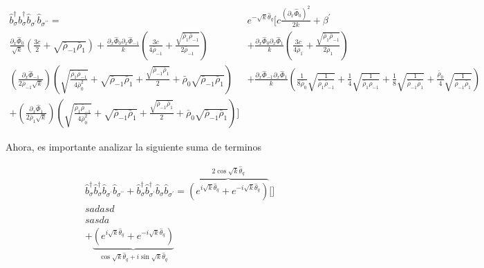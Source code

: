 \scriptsize
\begin{align}
\hat{b}_{\sigma}^{\dagger}\hat{b}_{\sigma}^{\dagger} \hat{b}_{\sigma^\prime}^{} \hat{b}_{\sigma^{\prime \prime}}^{} = & e^{-\sqrt{k}\hat{\theta}_{q}} \Big[  c \frac{(\partial_ x\hat{\Phi}_{0})^2}{2k} + \beta^{ \prime} \nonumber \\
\frac{\partial_x \hat{\Phi}_{0}}{\sqrt{k}} \left( \frac{3c}{2} + \sqrt{\bar{\rho}_{-1} \bar{\rho}_1}\right) + \frac{\partial_x \hat{\Phi}_{0}\partial_{x} \hat{\Phi}_{-1} }{k} \left( \frac{3c}{4 \bar{\rho}_{-1}} + \frac{\sqrt{\bar{\rho}_{1}\bar{\rho}_{-1}}}{2\bar{\rho}_{-1}} \right) &  + \frac{\partial_x \hat{\Phi}_{0}\partial_{x} \hat{\Phi}_{1} }{k} \left( \frac{3c}{4 \bar{\rho}_{1}} + \frac{\sqrt{\bar{\rho}_{1}\bar{\rho}_{-1}}}{2\bar{\rho}_{1}} \right)\\ 
 \left(\frac{\partial_x \hat{\Phi}_{-1}}{2 \bar{\rho}_{-1} \sqrt{k}}\right)\left(\sqrt{\frac{\bar{\rho}_1 \bar{\rho}_{-1}}{4 \bar{\rho}_0^2}}+\sqrt{\bar{\rho}_{-1} \bar{\rho}_1}+\frac{\sqrt{\bar{\rho}_{-1} \bar{\rho}_1}}{2}+\bar{\rho}_0 \sqrt{\bar{\rho}_{-1} \bar{\rho}_1}\right)&    +\frac{\partial_x \hat{\Phi}_{-1} \partial_x \hat{\Phi}_{1}}{k}\left(\frac{1}{8 \bar{\rho}_0} \sqrt{\frac{1}{\bar{\rho}_1 \bar{\rho}_{-1}}}+\frac{1}{4} \sqrt{\frac{1}{\bar{\rho}_1 \rho_{-1}}}+\frac{1}{8} \sqrt{\frac{1}{\bar{\rho}_{-1} \bar{\rho}_1}}+\frac{\bar{\rho}_0}{4} \sqrt{\frac{1}{\bar{\rho}_{-1} \bar{\rho}_1}}\right) \nonumber \\ 
 +  \left(\frac{\partial_x \hat{\Phi}_1}{2 \bar{\rho}_1 \sqrt{k}}\right)\left(\sqrt{\frac{\bar{\rho}_1 \bar{\rho}_{-1}}{4 \bar{\rho}_0^2}}+\sqrt{\bar{\rho}_{-1} \bar{\rho}_1}+\frac{\sqrt{\bar{\rho}_{-1} \bar{\rho}_1}}{2}+\bar{\rho}_0 \sqrt{\bar{\rho}_{-1} \bar{\rho}_1}\right) \Big] &
\end{align}

\normalsize
Ahora, es importante analizar la siguiente suma de terminos

\begin{align}
    \hat{b}_{\sigma}^{\dagger}\hat{b}_{\sigma}^{\dagger} \hat{b}_{\sigma^\prime}^{} \hat{b}_{\sigma^{\prime \prime}}^{} + \hat{b}_{\sigma}^{\dagger}\hat{b}_{\sigma^\prime}^{\dagger} \hat{b}_{\sigma}^{} \hat{b}_{\sigma^\prime}^{} = \overbrace{\left( e^{i\sqrt{k}\hat{\theta}_{q}} + e^{-i\sqrt{k}\hat{\theta}_{q}} \right)}^{2\cos{\sqrt{k}\hat{\theta}_{q}}} \Big[  \Big] \\
    sadasd\\
    sasda\\
    +\underbrace{\left( e^{i\sqrt{k}\hat{\theta}_{q}} + e^{-i\sqrt{k}\hat{\theta}_{q}} \right)}_{\cos{\sqrt{k}\hat{\theta}_{q}} + i\sin{\sqrt{k}\hat{\theta}_{q}}} \\ 
\end{align}

